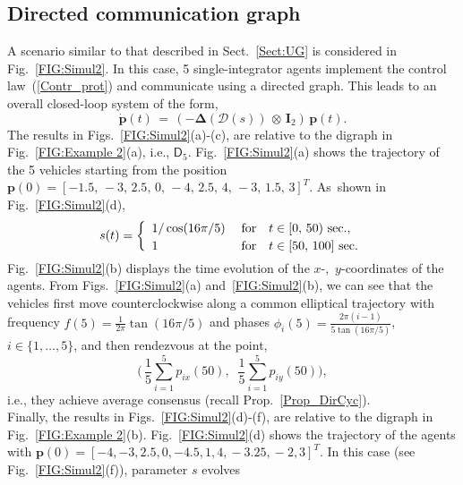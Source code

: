 \documentclass[letterpaper,9pt,twocolumn]{autart}
\newcommand{\vet}[1]{\ensuremath{{\mathbf #1}}}
\begin{document}
\vspace{-0.08cm}
\subsection{Directed communication graph}\label{Sect:DG}
\vspace{-0.1cm}
A scenario similar to that described in Sect.~\ref{Sect:UG} is considered in Fig.~\ref{FIG:Simul2}.
In this case, 5 single-integrator agents implement the control law~(\ref{Contr_prot}) and 
communicate using a directed graph. This leads to an overall closed-loop system of the form,
\begin{equation*}\label{Close_loop_dir}
\dot{\vet{p}}(t) \,=\, (-\boldsymbol{\Delta}(\mathcal{D}(s)) \,\otimes\, \vet{I}_2)\,\vet{p}(t).
\end{equation*}
The results in Figs.~\ref{FIG:Simul2}(a)-(c), are relative to
the digraph in Fig.~\ref{FIG:Example 2}(a), i.e., $\textsf{D}_5$. Fig.~\ref{FIG:Simul2}(a) shows the trajectory of the
5 vehicles starting from the position $\vet{p}(0) = [-1.5,\, -3,\, 2.5,\, 0,\, -4,\, 2.5,\, 4,\, -3,\,1.5,\, 3]^T$.
As~shown in Fig.~\ref{FIG:Simul2}(d),\vspace{-0.1cm}
$$
s(t) = \left\{
\begin{array}{lll}
1/\cos(16\pi/5)\; &\text{for} & t \in [0,\, 50)~\text{sec}.,\vspace{0.08cm}\\
1\; &\text{for} & t \in [50,\, 100]~\text{sec}.\vspace{-0.1cm}
\end{array}
\right.
$$
Fig.~\ref{FIG:Simul2}(b) displays the time evolution of the \mbox{$x$-, $y$}-coordinates of the
agents. From Figs.~\ref{FIG:Simul2}(a) and~\ref{FIG:Simul2}(b), we can see that the vehicles first
move counterclockwise along a common elliptical trajectory with frequency $f(5) =
\frac{1}{2\pi}\tan(16\pi/5)$ and phases $\phi_i(5) =
\frac{2\pi(i-1)}{5\tan(16\pi/5)}$, $i \in \{1,\ldots,5\}$, 
and then rendezvous at the point,\vspace{-0.1cm}
$$
\Big(\,\frac{1}{5}\sum_{i=1}^5 p_{ix}(50),\;\;\frac{1}{5}\sum_{i=1}^5 p_{iy}(50)\Big),
$$ 
i.e., they achieve average consensus (recall Prop.~\ref{Prop_DirCyc}).\\
Finally, the results in Figs.~\ref{FIG:Simul2}(d)-(f), are relative to
the digraph in Fig.~\ref{FIG:Example 2}(b). Fig.~\ref{FIG:Simul2}(d) shows the trajectory of the
agents with $\vet{p}(0) \!=\! [-4, -3, 2.5, 0, -4.5, 1, 4, \!-3.25, \!-2, 3]^T$\!.
In this case (see Fig.~\ref{FIG:Simul2}(f)), parameter $s$ evolves
\end{document}
